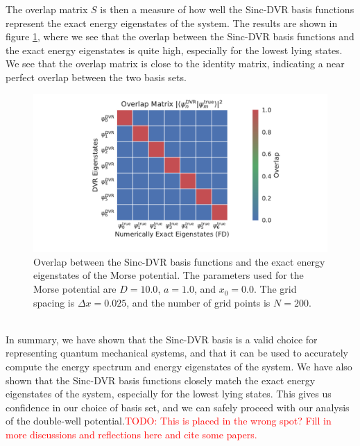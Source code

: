 \documentclass{subfiles}
\begin{document}
The overlap matrix $S$ is then a measure of how well the Sinc-DVR basis functions represent the exact energy eigenstates of the system. The results are shown in figure \ref{fig:dvr_validation_overlap}, where we see that the overlap between the Sinc-DVR basis functions and the exact energy eigenstates is quite high, especially for the lowest lying states. We see that the overlap matrix is close to the identity matrix, indicating a near perfect overlap between the two basis sets.
\begin{figure}[h!]
    \centering
    \includegraphics[width=\textwidth]{figs/dvr_validation_overlap.pdf}
    \caption{Overlap between the Sinc-DVR basis functions and the exact energy eigenstates of the Morse potential. The parameters used for the Morse potential are $D = 10.0$, $a = 1.0$, and $x_0 = 0.0$. The grid spacing is $\Delta x = 0.025$, and the number of grid points is $N = 200$.}
    \label{fig:dvr_validation_overlap}
\end{figure}
\\

In summary, we have shown that the Sinc-DVR basis is a valid choice for representing quantum mechanical systems, and that it can be used to accurately compute the energy spectrum and energy eigenstates of the system. We have also shown that the Sinc-DVR basis functions closely match the exact energy eigenstates of the system, especially for the lowest lying states. This gives us confidence in our choice of basis set, and we can safely proceed with our analysis of the double-well potential.\textcolor{red}{TODO: This is placed in the wrong spot? Fill in more discussions and reflections here and cite some papers.}
\end{document}
